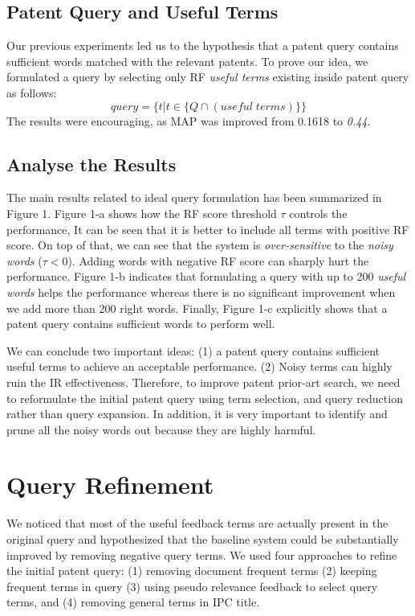 \documentclass{sig-alternate}
\begin{document}
\subsection{Patent Query and Useful Terms}
Our previous experiments led us to the hypothesis that a patent query contains sufficient words matched with the relevant patents.
To prove our idea, we formulated a query by selecting only RF {\em useful terms} existing inside patent query as follows: 
\begin{equation}
 query = \{t|t \in \{ Q\cap (useful \; terms)\}\}   
 \label{eq:score}
\end{equation}
The results were encouraging, as MAP was improved from 0.1618 to {\em 0.44}.
\subsection{Analyse the Results}
The main results related to ideal query formulation has been summarized in Figure 1. Figure 1-a shows how the RF score threshold $\tau$ controls the performance, It can be seen that it is better to include all terms with positive RF score. On top of that, we can see that the system is {\em over-sensitive} to the {\em noisy words} ($ \tau<0 $). Adding words with negative RF score can sharply hurt the performance. Figure 1-b indicates that formulating a query with up to 200 {\em useful words} helps the performance whereas there is no significant improvement when we add more than 200 right words. Finally, Figure 1-c explicitly shows that a patent query contains sufficient words to perform well. 
 
We can conclude two important ideas: (1) a patent query contains sufficient useful terms to achieve an acceptable performance. (2) Noisy terms can highly ruin the IR effectiveness. Therefore, to improve patent prior-art search, we need to reformulate the initial patent query using term selection, and query reduction rather than query expansion. In addition, it is very important to identify and prune all the noisy words out because they are highly harmful.  

\section{Query Refinement}
We noticed that most of the useful feedback terms are actually present in the original query and hypothesized that the baseline system could be substantially improved by removing negative query terms. We used four approaches to refine the initial patent query: (1) removing document frequent terms (2) keeping frequent terms in query (3) using pseudo relevance feedback to select query terms, and (4) removing general terms in IPC title. 
\end{document}
